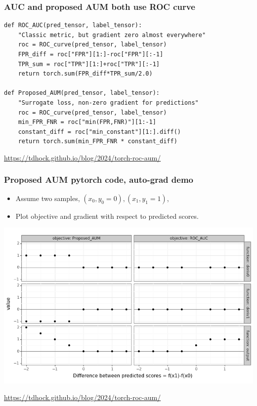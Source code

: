 \documentclass[t]{beamer}
\begin{document}
\begin{frame}[fragile]
  \frametitle{AUC and proposed AUM both use ROC curve}

  \begin{verbatim}
def ROC_AUC(pred_tensor, label_tensor):
    "Classic metric, but gradient zero almost everywhere"
    roc = ROC_curve(pred_tensor, label_tensor)
    FPR_diff = roc["FPR"][1:]-roc["FPR"][:-1]
    TPR_sum = roc["TPR"][1:]+roc["TPR"][:-1]
    return torch.sum(FPR_diff*TPR_sum/2.0)

def Proposed_AUM(pred_tensor, label_tensor):
    "Surrogate loss, non-zero gradient for predictions"
    roc = ROC_curve(pred_tensor, label_tensor)
    min_FPR_FNR = roc["min(FPR,FNR)"][1:-1]
    constant_diff = roc["min_constant"][1:].diff()
    return torch.sum(min_FPR_FNR * constant_diff)
\end{verbatim}

  \url{https://tdhock.github.io/blog/2024/torch-roc-aum/}
\end{frame}

\begin{frame}[fragile]
  \frametitle{Proposed AUM pytorch code, auto-grad demo}

  \begin{itemize}
  \item Assume two samples, $(x_0,y_0=0), (x_1,y_1=1)$,
  \item Plot objective and gradient with respect to predicted scores.
  \end{itemize}

  \includegraphics[width=\textwidth]{gg_aum_grad}

  \url{https://tdhock.github.io/blog/2024/torch-roc-aum/}
\end{frame}
\end{document}
